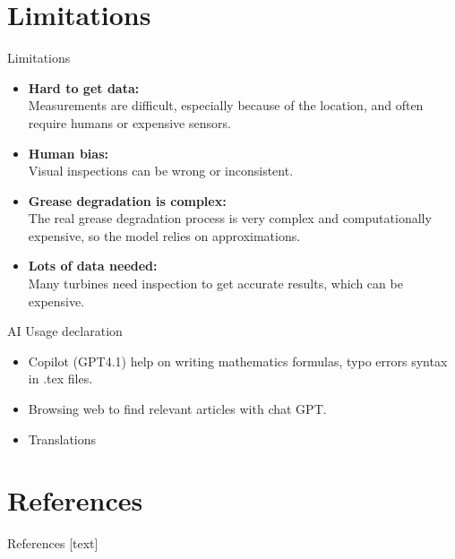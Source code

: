 \documentclass[aspectratio=169,xcolor=dvipsnames]{beamer}
\begin{document}
\section{Limitations}
\begin{frame}{Limitations}
    \begin{itemize}
        \item \textbf{Hard to get data:} \\
        Measurements are difficult, especially because of the location, and often require humans or expensive sensors.
        \item \textbf{Human bias:} \\
        Visual inspections can be wrong or inconsistent.
        \item \textbf{Grease degradation is complex:} \\ 
        The real grease degradation process is very complex and computationally expensive, so the model relies on approximations.
        \item \textbf{Lots of data needed:} \\
        Many turbines need inspection to get accurate results, which can be expensive.
    \end{itemize}
\end{frame}

\begin{frame}{AI Usage declaration}
    \begin{itemize}
        \item Copilot (GPT4.1) help on writing mathematics formulas, typo errors syntax in .tex files.
        \item Browsing web to find relevant articles with chat GPT.
        \item Translations
    \end{itemize}
\end{frame}

\section{References}
\begin{frame}{References}
    \nocite{*}
    [text]
    
    
\end{frame}
\end{document}
